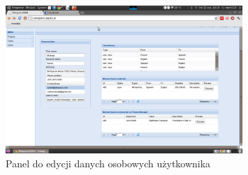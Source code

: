\documentclass[licencjacka]{pracamgr}
\begin{document}
\begin{figure}[h!]
\centering
\includegraphics[width=0.8\textwidth]{resources/edycja_danych.png}
\caption{Panel do edycji danych osobowych użytkownika}
\end{figure}
\end{document}
